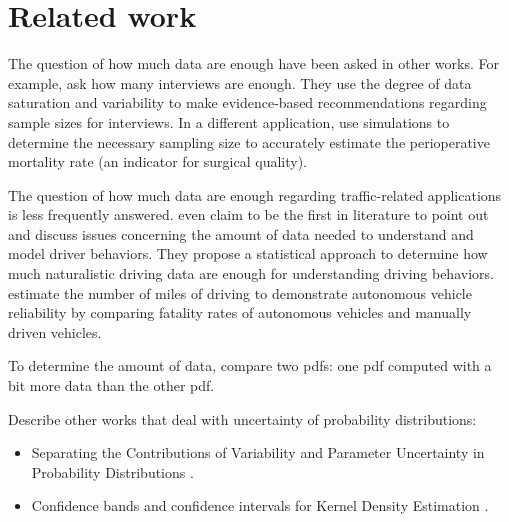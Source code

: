\section{Related work}
\label{sec:related}

The question of how much data are enough have been asked in other works. For example, \textcite{guest2006many} ask how many interviews are enough. They use the degree of data saturation and variability to make evidence-based recommendations regarding sample sizes for interviews. In a different application, \textcite{marks2018howmuch} use simulations to determine the necessary sampling size to accurately estimate the perioperative mortality rate (an indicator for surgical quality).

The question of how much data are enough regarding traffic-related applications is less frequently answered. \textcite{wang2017much} even claim to be the first in literature to point out and discuss issues concerning the amount of data needed to understand and model driver behaviors. They propose a statistical approach to determine how much naturalistic driving data are enough for understanding driving behaviors. \textcite{kalra2016driving} estimate the number of miles of driving to demonstrate autonomous vehicle reliability by comparing fatality rates of autonomous vehicles and manually driven vehicles.

To determine the amount of data, \textcite{wang2017much} compare two pdfs: one pdf computed with a bit more data than the other pdf. 

\color{red}


Describe other works that deal with uncertainty of probability distributions:
\begin{itemize}
	\item Separating the Contributions of Variability and Parameter Uncertainty in Probability Distributions \cite{sankararaman2013separating}.
	\item Confidence bands and confidence intervals for Kernel Density Estimation \cite{chen2017tutorial}.
\end{itemize}

\color{black}

